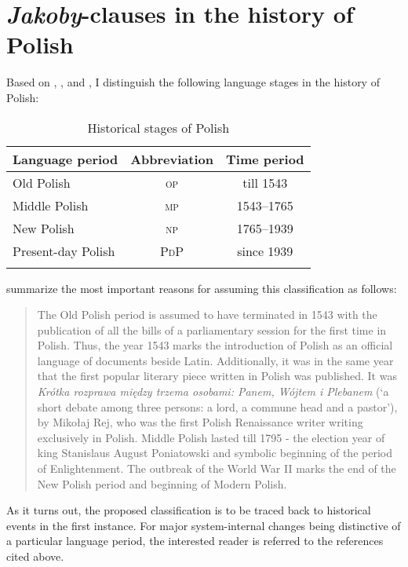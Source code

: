 \documentclass[output=paper
,modfonts
,nonflat]{langsci/langscibook}
\begin{document}
\section{\emph{Jakoby}-clauses in the history of Polish} \label{diachrony}

Based on \textcite{Klemensiewicz2009}, \textcite{Walczak1999}, and \textcite{Dziubalska-Koaczyk-Walczak2010}, I distinguish the following language stages in the history of Polish:


\begin{table}[h]
\begin{tabular}{lcc}
\lsptoprule
Language period & Abbreviation & Time period  \\
\midrule
 Old Polish & \textsc{op} & till 1543 \\
 Middle Polish & \textsc{mp} & 1543--1765  \\
 New Polish & \textsc{np} & 1765--1939 \\
 Present-day Polish & \textsc{PdP} & since 1939 \\
\lspbottomrule
\end{tabular}
\caption{Historical stages of Polish}
\end{table}

\noindent \textcite[823]{Dziubalska-Koaczyk-Walczak2010} summarize the most important reasons for assuming this classification as follows:

\begin{quote}
The Old Polish period is assumed to have terminated in 1543 with the publication of all the bills of a parliamentary session for the first time in Polish. Thus, the year 1543 marks the introduction of Polish as an official language of documents beside Latin. Additionally, it was in the same year that the first popular literary piece written in Polish was published. It was \emph{Krótka rozprawa między trzema osobami: Panem, Wójtem i Plebanem} (`a short debate among three persons: a lord, a commune head and a pastor'), by Mikołaj Rej, who was the first Polish Renaissance writer writing exclusively in Polish. Middle Polish lasted till 1795 - the election year of king Stanislaus August Poniatowski and symbolic beginning of the period of Enlightenment. The outbreak of the World War II marks the end of the New Polish period and beginning of Modern Polish.
\end{quote}

\noindent As it turns out, the proposed classification is to be traced back to historical events in the first instance. For major system-internal changes being distinctive of a particular language period, the interested reader is referred to the references cited above.
\end{document}
